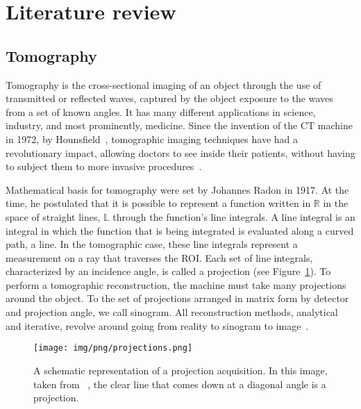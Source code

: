 \section{Literature review}%
\label{sec:literature_review}

\subsection{Tomography}%
\label{sub:tomography}

Tomography is the cross-sectional imaging of an object through the use
of transmitted or reflected waves, captured by the object exposure to
the waves from a set of known angles. It has many different applications
in science, industry, and most prominently, medicine. Since the invention
of the \gls{CT} machine in 1972, by Hounsfield~\cite{Gunderman2006},
tomographic imaging techniques have had a revolutionary impact, allowing
doctors to see inside their patients, without having to subject them to
more invasive procedures~\cite{Kak2001}.

Mathematical basis for tomography were set by Johannes Radon in 1917. At
the time, he postulated that  it is possible to represent a function
written in $\mathbb{R}$ in the space of straight lines, $\mathbb{L}$
through the function's line integrals. A line integral is an integral in
which the function that is being integrated is evaluated along a curved
path, a line. In the tomographic case, these line integrals represent a
measurement on a ray that traverses the \gls{ROI}.  Each set of line
integrals, characterized by an incidence angle, is called a projection
(see Figure~\ref{fig:projection}). To perform a tomographic
reconstruction, the machine must take many projections around the
object. To the set of projections arranged in matrix form by detector
and projection angle, we call sinogram. All reconstruction methods,
analytical and iterative, revolve around going from reality to sinogram
to image~\cite{Bruyant2002, Kak2001, Herman1973, Herman1995, Herman2009,
Defrise2003}.

\begin{figure}[htpb]
    \centering
    \texttt{[image: img/png/projections.png]}
    \caption{A schematic representation of a projection acquisition. In
    this image, taken from ~\cite{Herman2009}, the clear line that comes
    down at a diagonal angle is a projection.}
    \label{fig:projection}
\end{figure}

